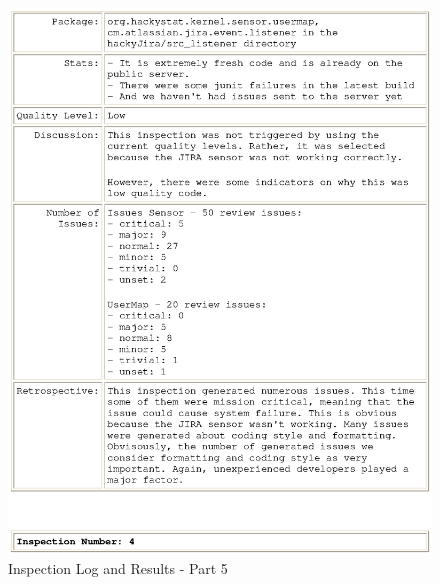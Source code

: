 \begin{figure}[htbp]
  \centering
  \includegraphics[width=1.0\textwidth]{figs/engineeringlog_word_html_5.eps}
  \caption{Inspection Log and Results - Part 5}
  \label{fig:log5}
\end{figure}

